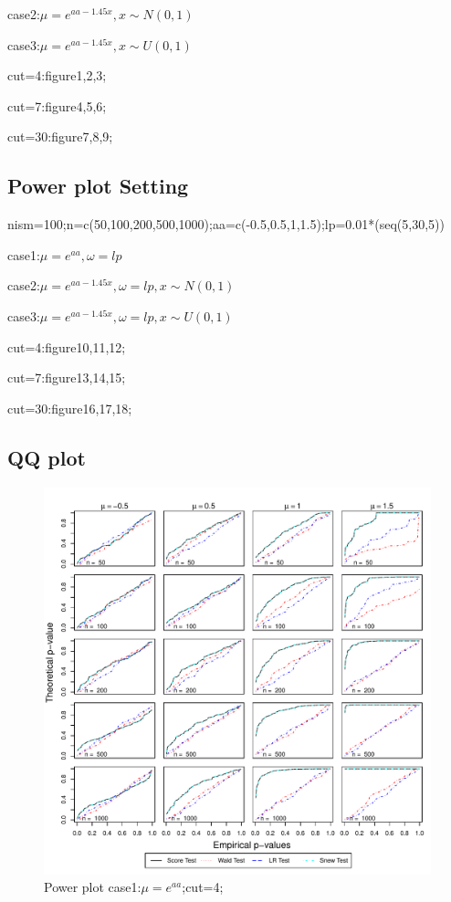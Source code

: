 \documentclass[11pt]{article}
\numberwithin{equation}{section}
\begin{document}
case2:$\mu=e^{aa-1.45x},x\sim N(0,1)$

case3:$\mu=e^{aa-1.45x},x\sim U(0,1)$

cut=4:figure1,2,3;

cut=7:figure4,5,6;

cut=30:figure7,8,9;

\subsection{Power plot Setting}
nism=100;n=c(50,100,200,500,1000);aa=c(-0.5,0.5,1,1.5);lp=0.01*(seq(5,30,5))

case1:$\mu=e^{aa},\omega=lp$

case2:$\mu=e^{aa-1.45x},\omega=lp,x\sim N(0,1)$

case3:$\mu=e^{aa-1.45x},\omega=lp,x\sim U(0,1)$

cut=4:figure10,11,12;

cut=7:figure13,14,15;

cut=30:figure16,17,18;


\subsection{QQ plot}
\begin{figure}
  \centering
  \includegraphics[width=\columnwidth]{./figure/q/q41.pdf}
  \caption{Power plot case1:$\mu=e^{aa}$;cut=4;}
\end{figure}
\end{document}
